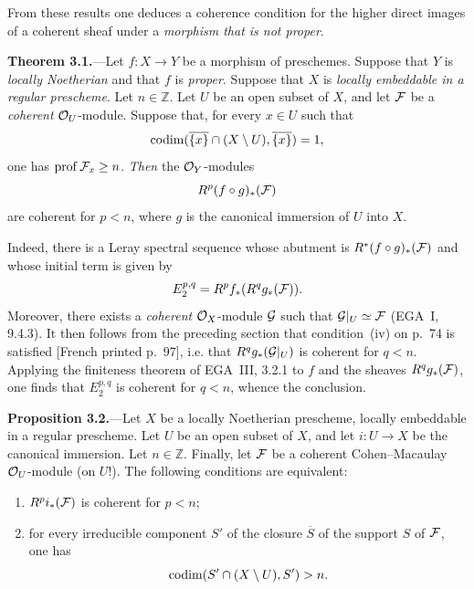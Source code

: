 \noindent From these results one deduces a coherence condition for the higher
direct images of a coherent sheaf under a \emph{morphism that is not proper}.

\medskip
{}\noindent\textbf{Theorem 3.1.}---Let $f\colon X\to Y$ be a morphism of
preschemes. Suppose that $Y$ is \emph{locally Noetherian} and that $f$ is
\emph{proper}. Suppose that $X$ is \emph{locally embeddable in a regular
prescheme}. Let $n\in\mathbb Z$. Let $U$ be an open subset of $X$, and let
$\cF$ be a \emph{coherent} $\mathcal O_U$-module. Suppose that, for every $x\in U$
such that
\[
  \operatorname{codim}(\overline{\{x\}}\cap(X\setminus U),
  \overline{\{x\}})=1,
\]
one has $\prof\cF_x\geq n$. \emph{Then} the $\mathcal O_Y$-modules
\[
  R^p(f\circ g)_*(\cF)
\]
are coherent for $p<n$, where $g$ is the canonical immersion of $U$ into
$X$.

\medskip
\noindent Indeed, there is a Leray spectral sequence whose abutment is
$R^*(f\circ g)_*(\cF)$ and whose initial term is given by
\[
  E_2^{p,q}=R^p f_*(R^q g_*(\cF)).
\]
Moreover, there exists a \emph{coherent} $\mathcal O_X$-module $\mathcal G$ such that
$\cG|_U\simeq\cF$ (EGA~I, 9.4.3). It then follows from the preceding section
that condition~\textup{(iv)} on p.~74 is satisfied
{\scriptsize\color{gray}[French printed p.~97]}, i.e. that
$R^q g_*(\mathcal G|_U)$ is coherent for $q<n$. Applying the finiteness theorem of
EGA~III, 3.2.1 to $f$ and the sheaves $R^q g_*(\cF)$, one finds that
$E_2^{p,q}$ is coherent for $q<n$, whence the conclusion.


\medskip
{}\noindent\textbf{Proposition 3.2.}---Let $X$ be a locally Noetherian
prescheme, locally embeddable in a regular prescheme. Let $U$ be an open
subset of $X$, and let $i\colon U\to X$ be the canonical immersion. Let
$n\in\mathbb Z$. Finally, let $\cF$ be a coherent Cohen--Macaulay
$\mathcal O_U$-module (on $U$!). The following conditions are equivalent:
\begin{enumerate}
\item[(a)] $R^p i_*(\cF)$ is coherent for $p<n$;
\item[(b)] for every irreducible component $S'$ of the closure $\overline S$
of the support $S$ of $\cF$, one has
\[
  \operatorname{codim}(S'\cap(X\setminus U),S')>n.
\]
\end{enumerate}

